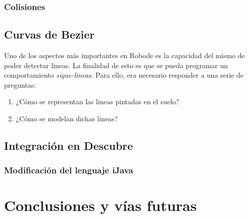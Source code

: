 \subsection{Colisiones}
\label{sec:colisiones}




\section{Curvas de Bezier}
\label{sec:bezier}

Uno de los aspectos más importantes en Robode es la capacidad del mismo de poder detectar lineas. La finalidad de esto es que se pueda programar un comportamiento \emph{sigue-lineas}. Para ello, era necesario responder a una serie de preguntas:
\begin{enumerate}
	\item ¿Cómo se representan las lineas pintadas en el suelo?
	\item ¿Cómo se modelan dichas lineas?
\end{enumerate}


\section{Integración en Descubre}
\label{sec:integracion-descubre}

\subsection{Modificación del lenguaje iJava}
\label{sec:modificacion-ijava}




\chapter{Conclusiones y vías futuras}\label{conslusiones}






